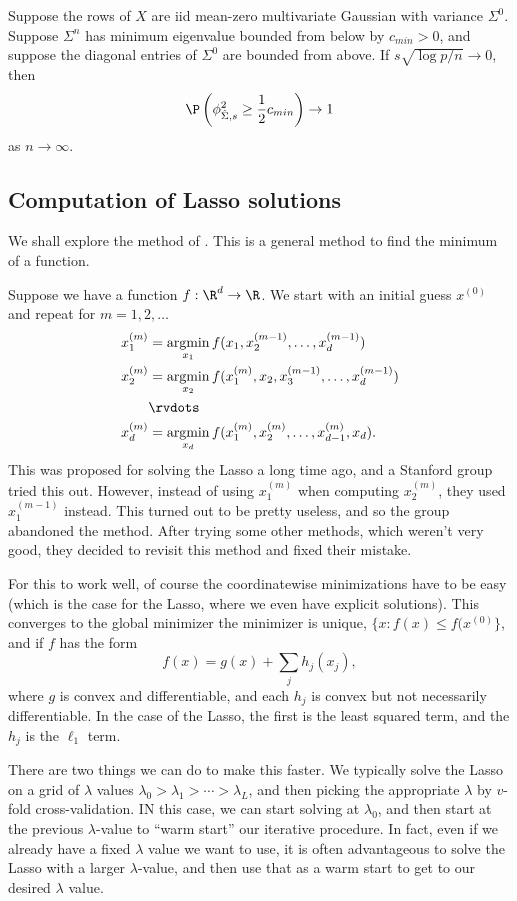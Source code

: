 \documentclass[a4paper]{article}
\DeclareMathOperator*\argmin{argmin}
\begin{document}
\begin{cor}
  Suppose the rows of $X$ are iid mean-zero multivariate Gaussian with variance $\Sigma^0$. Suppose $\Sigma^n$ has minimum eigenvalue bounded from below by $c_{min} > 0$, and suppose the diagonal entries of $\Sigma^0$ are bounded from above. If $s \sqrt{\log p / n} \to 0$, then
  \[
    \P\left(\phi_{\hat{\Sigma}, s}^2 \geq \frac{1}{2} c_{min}\right) \to 1
  \]
  as $n \to \infty$.
\end{cor}

\subsection{Computation of Lasso solutions}
We shall explore the method of . This is a general method to find the minimum of a function.

Suppose we have a function $f: \R^d \to \R$. We start with an initial guess $x^{(0)}$ and repeat for $m = 1, 2, \ldots$
\begin{align*}
  x_1^{(m)} &= \argmin_{x_1} f(x_1, x_2^{(m - 1)}, \ldots, x_d^{(m - 1)})\\
  x_2^{(m)} &= \argmin_{x_2} f(x_1^{(m)}, x_2, x_3^{(m - 1)}, \ldots, x_d^{(m - 1)})\\
  &\rvdots\\
  x_d^{(m)} &= \argmin_{x_d} f(x_1^{(m)}, x_2^{(m)}, \ldots, x_{d - 1}^{(m)}, x_d).
\end{align*}
This was proposed for solving the Lasso a long time ago, and a Stanford group tried this out. However, instead of using $x_1^{(m)}$ when computing $x_2^{(m)}$, they used $x^{(m - 1)}_1$ instead. This turned out to be pretty useless, and so the group abandoned the method. After trying some other methods, which weren't very good, they decided to revisit this method and fixed their mistake.

For this to work well, of course the coordinatewise minimizations have to be easy (which is the case for the Lasso, where we even have explicit solutions). This converges to the global minimizer the minimizer is unique, $\{x : f(x) \leq f(x^{(0)}\}$, and if $f$ has the form
\[
  f(x) = g(x) + \sum_j h_j(x_j),
\]
where $g$ is convex and differentiable, and each $h_j$ is convex but not necessarily differentiable. In the case of the Lasso, the first is the least squared term, and the $h_j$ is the $\ell_1$ term.

There are two things we can do to make this faster. We typically solve the Lasso on a grid of $\lambda$ values $\lambda_0 > \lambda_1 > \cdots > \lambda_L$, and then picking the appropriate $\lambda$ by $v$-fold cross-validation. IN this case, we can start solving at $\lambda_0$, and then start at the previous $\lambda$-value to ``warm start'' our iterative procedure. In fact, even if we already have a fixed $\lambda$ value we want to use, it is often advantageous to solve the Lasso with a larger $\lambda$-value, and then use that as a warm start to get to our desired $\lambda$ value.
\end{document}
